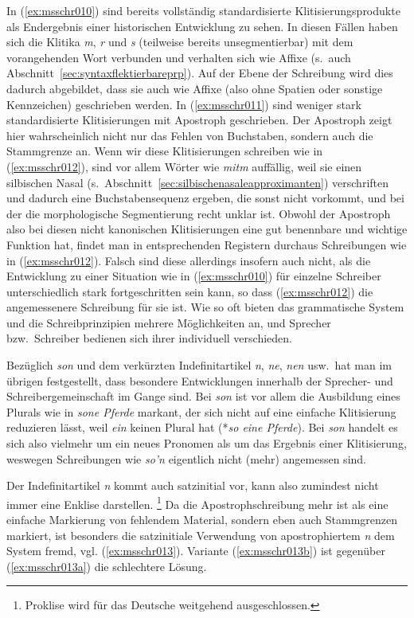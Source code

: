 In (\ref{ex:msschr010}) sind bereits vollständig standardisierte Klitisierungsprodukte als Endergebnis einer historischen Entwicklung zu sehen.
In diesen Fällen haben sich die Klitika \textit{m}, \textit{r} und \textit{s} (teilweise bereits unsegmentierbar) mit dem vorangehenden Wort verbunden und verhalten sich wie Affixe (s.\ auch Abschnitt~\ref{sec:syntaxflektierbareprp}).
Auf der Ebene der Schreibung wird dies dadurch abgebildet, dass sie auch wie Affixe (also ohne Spatien oder sonstige Kennzeichen) geschrieben werden.
In (\ref{ex:msschr011}) sind weniger stark standardisierte Klitisierungen mit Apostroph geschrieben.
Der Apostroph zeigt hier wahrscheinlich nicht nur das Fehlen von Buchstaben, sondern auch die Stammgrenze an.
Wenn wir diese Klitisierungen schreiben wie in (\ref{ex:msschr012}), sind vor allem Wörter wie \textit{mitm} auffällig, weil sie einen silbischen Nasal (s.\ Abschnitt~\ref{sec:silbischenasaleapproximanten}) verschriften und dadurch eine Buchstabensequenz ergeben, die sonst nicht vorkommt, und bei der die morphologische Segmentierung recht unklar ist.
Obwohl der Apostroph also bei diesen nicht kanonischen Klitisierungen eine gut benennbare und wichtige Funktion hat, findet man in entsprechenden Registern durchaus Schreibungen wie in (\ref{ex:msschr012}).
Falsch sind diese allerdings insofern auch nicht, als die Entwicklung zu einer Situation wie in (\ref{ex:msschr010}) für einzelne Schreiber unterschiedlich stark fortgeschritten sein kann, so dass (\ref{ex:msschr012}) die angemessenere Schreibung für sie ist.
Wie so oft bieten das grammatische System und die Schreibprinzipien mehrere Möglichkeiten an, und Sprecher bzw.\ Schreiber bedienen sich ihrer individuell verschieden.

Bezüglich \textit{son} und dem verkürzten Indefinitartikel \textit{n}, \textit{ne}, \textit{nen} usw.\ hat man im übrigen festgestellt, dass besondere Entwicklungen innerhalb der Sprecher- und Schreibergemeinschaft im Gange sind.
Bei \textit{son} ist vor allem die Ausbildung eines Plurals wie in \textit{sone Pferde} markant, der sich nicht auf eine einfache Klitisierung reduzieren lässt, weil \textit{ein} keinen Plural hat (*\textit{so eine Pferde}).
Bei \textit{son} handelt es sich also vielmehr um ein neues Pronomen als um das Ergebnis einer Klitisierung, weswegen Schreibungen wie \textit{so'n} eigentlich nicht (mehr) angemessen sind.

Der Indefinitartikel \textit{n} kommt \zB auch satzinitial vor, kann also zumindest nicht immer eine Enklise darstellen.\label{abs:nen}%
\footnote{Proklise wird für das Deutsche weitgehend ausgeschlossen.}
Da die Apo\-stroph\-schrei\-bung mehr ist als eine einfache Markierung von fehlendem Material, sondern eben auch Stammgrenzen markiert, ist besonders die satzinitiale Verwendung von apostrophiertem \textit{n} dem System fremd, vgl. (\ref{ex:msschr013}).
Variante (\ref{ex:msschr013b}) ist gegenüber (\ref{ex:msschr013a}) die schlechtere Lösung.


